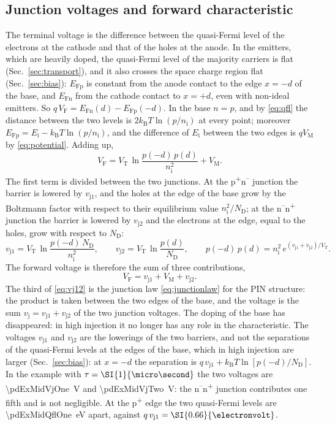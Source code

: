 \documentclass[10pt,a4paper]{scrartcl}
\newcommand{\VF}{V_\mathrm{F}}
\newcommand{\vj}{v_\mathrm{j}}
\newcommand{\vjo}{v_\mathrm{j1}}
\newcommand{\vjt}{v_\mathrm{j2}}
\newcommand{\VT}{V_\mathrm{T}}
\newcommand{\ND}{N_\mathrm{D}}
\newcommand{\nint}{n_\mathrm{i}}
\newcommand{\VM}{V_\mathrm{M}}
\newcommand{\kB}{k_\mathrm{B}}
\newcommand{\EFn}{E_\mathrm{Fn}}
\newcommand{\EFp}{E_\mathrm{Fp}}
\newcommand{\Pp}{p\textsuperscript{+}}
\newcommand{\Nm}{n\textsuperscript{--}}
\newcommand{\Np}{n\textsuperscript{+}}
\begin{document}
\subsection{Junction voltages and forward characteristic}
\label{sec:vf}
The terminal voltage is the difference between the quasi-Fermi level of the electrons at the cathode and that of the holes at the anode. In the emitters, which are heavily doped, the quasi-Fermi level of the majority carriers is flat (Sec.~\ref{sec:transport}), and it also crosses the space charge region flat (Sec.~\ref{sec:bias}): $\EFp$ is constant from the anode contact to the edge $x = -d$ of the base, and $\EFn$ from the cathode contact to $x = +d$, even with non-ideal emitters. So $q\,\VF = \EFn(d) - \EFp(-d)$. In the base $n = p$, and by \eqref{eq:qfl} the distance between the two levels is $2\kB T\ln(p/\nint)$ at every point; moreover $\EFp = E_\mathrm{i} - \kB T\ln(p/\nint)$, and the difference of $E_\mathrm{i}$ between the two edges is $q\VM$ by \eqref{eq:potential}. Adding up,
\begin{equation}
\VF = \VT\,\ln\frac{p(-d)\,p(d)}{\nint^2} + \VM .
\label{eq:vfqfl}
\end{equation}
The first term is divided between the two junctions. At the \Pp\Nm{} junction the barrier is lowered by $\vjo$, and the holes at the edge of the base grow by the Boltzmann factor with respect to their equilibrium value $\nint^2/\ND$; at the \Nm\Np{} junction the barrier is lowered by $\vjt$ and the electrons at the edge, equal to the holes, grow with respect to $\ND$:
\begin{equation}
\vjo = \VT\,\ln\frac{p(-d)\,\ND}{\nint^2} , \qquad \vjt = \VT\,\ln\frac{p(d)}{\ND} , \qquad
p(-d)\,p(d) = \nint^2\,e^{(\vjo+\vjt)/\VT} .
\label{eq:vj12}
\end{equation}
The forward voltage is therefore the sum of three contributions,
\begin{equation}
\VF = \vjo + \VM + \vjt .
\label{eq:vfsum}
\end{equation}
The third of \eqref{eq:vj12} is the junction law \eqref{eq:junctionlaw} for the PIN structure: the product is taken between the two edges of the base, and the voltage is the sum $\vj = \vjo + \vjt$ of the two junction voltages. The doping of the base has disappeared: in high injection it no longer has any role in the characteristic. The voltages $\vjo$ and $\vjt$ are the lowerings of the two barriers, and not the separations of the quasi-Fermi levels at the edges of the base, which in high injection are larger (Sec.~\ref{sec:bias}): at $x = -d$ the separation is $q\,\vjo + \kB T\ln[p(-d)/\ND]$. In the example with $\tau = \SI{\pdExMidTau}{\micro\second}$ the two voltages are \SI{\pdExMidVjOne}{\volt} and \SI{\pdExMidVjTwo}{\volt}: the \Nm\Np{} junction contributes one fifth and is not negligible. At the \Pp{} edge the two quasi-Fermi levels are \SI{\pdExMidQflOne}{\electronvolt} apart, against $q\,\vjo = \SI{\pdExMidVjOne}{\electronvolt}$.
\end{document}
